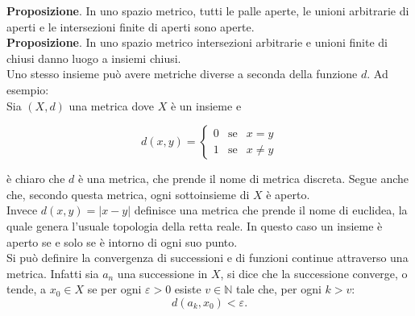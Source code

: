 \documentclass[a4paper,twoside]{article}
\renewcommand{\epsilon}{\varepsilon}
\newcommand{\N}{\mathbb{N}}
\theoremstyle{definition}
\numberwithin{theorem}{section}
\begin{document}
\textbf{Proposizione}. In uno spazio metrico, tutti le palle aperte, le unioni arbitrarie di aperti e le intersezioni finite di aperti sono aperte.\\
\textbf{Proposizione}. In uno spazio metrico intersezioni arbitrarie e unioni finite di chiusi danno luogo a insiemi chiusi.\\

Uno stesso insieme può avere metriche diverse a seconda della funzione $d$. Ad esempio: \\
Sia $(X,d)$ una metrica dove $X$ è un insieme e

$$ d(x,y)=\left\{\begin{array}{ccl} 0 &\text{se} & x=y\\ 1 &\text{se} & x\neq y\end{array}\right. $$

è chiaro che $d$ è una metrica, che prende il nome di metrica discreta. Segue anche che, secondo questa metrica, ogni sottoinsieme di $X$ è aperto.\\
Invece $d(x,y)=|x-y|$ definisce una metrica che prende il nome di euclidea, la quale genera l'usuale topologia della retta reale. In questo caso un insieme è aperto se e solo se è intorno di ogni suo punto.\\
Si può definire la convergenza di successioni e di funzioni continue attraverso una metrica. Infatti sia $a_n$ una successione in $X$, si dice che la successione converge, o tende, a $x_0\in X$ se per ogni $\epsilon>0$ esiste $v\in \N$ tale che, per ogni $k>v$: \\
$$d(a_k,x_0)<\epsilon.$$
\end{document}
